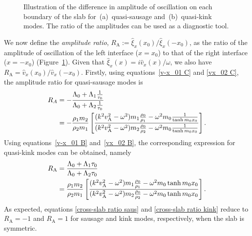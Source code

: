 \documentclass[namedreferences]{solarphysics}
\numberwithin{equation}{section}
\begin{document}
\begin{article}
\begin{figure}
{{{
}}}
\caption{Illustration of the difference in amplitude of oscillation on each boundary of the slab for~(a)~quasi-sausage and~(b)~quasi-kink modes. The ratio of the amplitudes can be used as a diagnostic tool.}
\label{fig: RA}
\end{figure}

We now define the \emph{amplitude ratio}, $R_\textrm{A} := \widehat{\xi}_x(x_0) / \widehat{\xi}_x(-x_0)$, as the ratio of the amplitude of oscillation of the left interface ($x=x_0$) to that of the right interface ($x=-x_0$) (Figure~\ref{fig: RA}). Given that ${\widehat{\xi}_x(x) = i\widehat{v}_x(x) / \omega}$, we also have $R_\textrm{A} = \widehat{v}_x(x_0) / \widehat{v}_x(-x_0)$. Firstly, using equations~\eqref{v-x_01 C} and \eqref{vx_02 C}, the amplitude ratio for quasi-sausage modes is
\begin{align}
R_A &=-\frac{\Lambda_0+\Lambda_1\frac{1}{\tau_0}}{\Lambda_0+\Lambda_2\frac{1}{\tau_0}} \notag \\
	&=-\frac{\rho_1m_2}{\rho_2m_1}\left[\frac{(k^2v_\textrm{A}^2-\omega^2)m_1\frac{\rho_0}{\rho_1}-\omega^2m_0\frac{1}{\tanh{m_0x_0}}}{(k^2v_\textrm{A}^2-\omega^2)m_2\frac{\rho_0}{\rho_2}-\omega^2m_0\frac{1}{\tanh{m_0x_0}}}\right]. \label{cross-slab ratio saus}
\end{align}
Using equations~\eqref{v-x_01 B} and~\eqref{vx_02 B}, the corresponding expression for quasi-kink modes can be obtained, namely
\begin{align}
R_\textrm{A}&=\frac{\Lambda_0+\Lambda_1\tau_0}{\Lambda_0+\Lambda_2\tau_0} \notag \\
	&=\frac{\rho_1m_2}{\rho_2m_1}\left[\frac{(k^2v_\textrm{A}^2-\omega^2)m_1\frac{\rho_0}{\rho_1}-\omega^2m_0\tanh{m_0x_0}}{(k^2v_\textrm{A}^2-\omega^2)m_2\frac{\rho_0}{\rho_2}-\omega^2m_0\tanh{m_0x_0}}\right]. \label{cross-slab ratio kink}
\end{align}
As expected, equations \eqref{cross-slab ratio saus} and \eqref{cross-slab ratio kink} reduce to $R_\textrm{A} = -1$ and $R_\textrm{A} = 1$ for sausage and kink modes, respectively, when the slab is symmetric.


\end{article}
\end{document}
